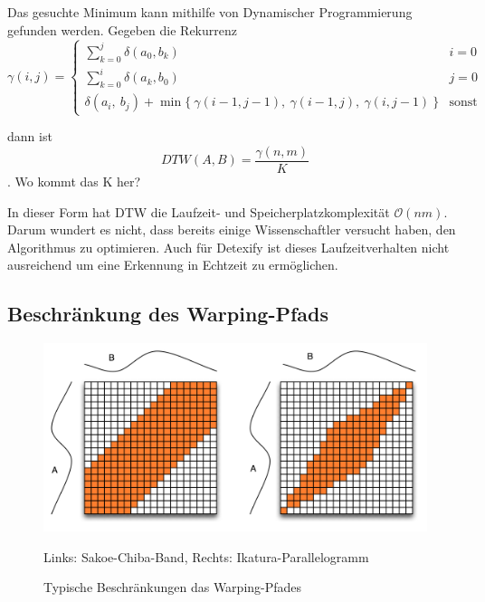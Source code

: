 Das gesuchte Minimum kann mithilfe von Dynamischer Programmierung gefunden werden. Gegeben die Rekurrenz
\begin{equation}
  \label{eqn:dp}
  \gamma(i,j) =
  \begin{cases}
    \sum_{k=0}^j \delta(a_0, b_k) & i = 0 \\
    \sum_{k=0}^i \delta(a_k, b_0) & j = 0 \\
    \delta(a_i,~b_j) + \min\{~\gamma(i-1,j-1),~\gamma(i-1,j),~\gamma(i,j-1)~\} & \text{sonst}
  \end{cases}  
\end{equation}

dann ist
\begin{equation}
  \label{eqn:dpdtw}
  DTW(A,B) = \frac{\gamma(n,m)}{K}
\end{equation}. \TODO Wo kommt das K her?

In dieser Form hat DTW die Laufzeit- und Speicherplatzkomplexität \(\mathcal{O}(nm)\). Darum wundert es nicht, dass bereits einige Wissenschaftler versucht haben, den Algorithmus zu optimieren. Auch für Detexify ist dieses Laufzeitverhalten nicht ausreichend um eine Erkennung in Echtzeit zu ermöglichen.


\subsection{Beschränkung des Warping-Pfads} %
\label{sub:constrained_warping_window}

\begin{figure}
  \centering \includegraphics[width=\textwidth]{figures/constraints.png}
  \caption{Typische Beschränkungen das Warping-Pfades}
   Links: Sakoe-Chiba-Band, Rechts: Ikatura-Parallelogramm
  \label{fig:constraints}
\end{figure}



